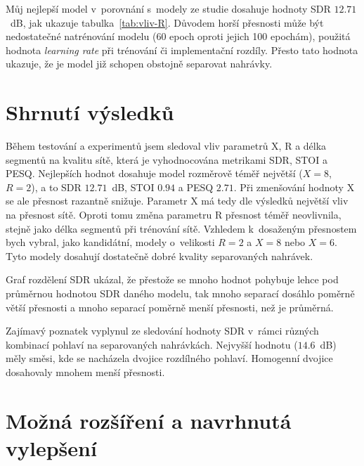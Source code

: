 Můj nejlepší model v~porovnání s~modely ze studie dosahuje hodnoty SDR $12.71$~dB, jak ukazuje tabulka~\ref{tab:vliv-R}. Důvodem horší přesnosti může být nedostatečné natrénování modelu (60 epoch oproti jejich 100 epochám), použitá hodnota \textit{learning rate} při trénování či implementační rozdíly. Přesto tato hodnota ukazuje, že je model již schopen obstojně separovat nahrávky.


\section{Shrnutí výsledků}


Během testování a experimentů jsem sledoval vliv parametrů X, R a délka segmentů na kvalitu sítě, která je vyhodnocována metrikami SDR, STOI a PESQ. Nejlepších hodnot dosahuje model rozměrově téměř největší ($X = 8$, $R=2$), a to SDR $12.71$~dB, STOI $0.94$ a PESQ $2.71$. Při zmenšování hodnoty X se ale přesnost razantně snižuje. Parametr X má tedy dle výsledků největší vliv na přesnost sítě. Oproti tomu změna parametru R přesnost téměř neovlivnila, stejně jako délka segmentů při trénování sítě. Vzhledem k~dosaženým přesnostem bych vybral, jako kandidátní, modely o~velikosti $R=2$ a $X=8$ nebo $X=6$. Tyto modely dosahují dostatečně dobré kvality separovaných nahrávek.



Graf rozdělení SDR ukázal, že přestože se mnoho hodnot pohybuje lehce pod průměrnou hodnotou SDR daného modelu, tak mnoho separací dosáhlo poměrně větší přesnosti a mnoho separací poměrně menší přesnosti, než je průměrná.

Zajímavý poznatek vyplynul ze sledování hodnoty SDR v~rámci různých kombinací pohlaví na separovaných nahrávkách. Nejvyšší hodnotu ($14.6$~dB) měly směsi, kde se nacházela dvojice rozdílného pohlaví. Homogenní dvojice dosahovaly mnohem menší přesnosti.


\section{Možná rozšíření a navrhnutá vylepšení}

